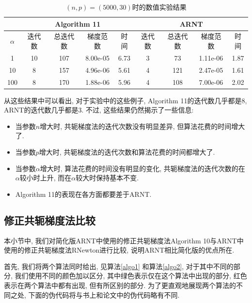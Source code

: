 \documentclass[UTF8]{ctexart}
\begin{document}
\begin{table}[htb]
    \centering
    \begin{tabular}{|c|cccc|cccc|}
        \hline
         & \multicolumn{4}{|c|}{Algorithm 11} & \multicolumn{4}{|c|}{ARNT}\\
        \hline
        $\alpha$ & 迭代数 & 总迭代数 & 梯度范数 & 时间 & 迭代数 & 总迭代数 & 梯度范数 & 时间\\
        \hline
        1 & 10 & 107 & 8.00e-05 & 6.73 & 3 & 73 & 1.11e-06 & 1.87 \\
        \hline
        10 & 8 & 157 & 4.96e-06 & 5.61 & 4 & 121 & 2.47e-05 & 1.61 \\
        \hline 
        100 & 8 & 170 & 1.88e-06 & 5.96 & 4 & 108 & 7.00e-06 & 2.02 \\
        \hline
    \end{tabular}
    \caption{$(n,p)=(5000,30)$时的数值实验结果}\label{tab5}
\end{table}

从这些结果中可以看出, 对于实验中的这些例子, Algorithm 11的迭代数几乎都是$8$, ARNT的迭代数几乎都是$3$. 不过, 这些结果仍然揭示了一些信息: 
\begin{itemize}
    \item 当参数$n$增大时, 共轭梯度法的迭代次数没有明显差异, 但算法花费的时间增大了. 
    \item 当参数$p$增大时, 共轭梯度法的迭代次数和算法花费的时间都增大了. 
    \item 当参数$\alpha$增大时, 算法花费的时间没有明显的变化, 共轭梯度法的迭代次数的在$\alpha$较小时上升, 而在$\alpha$较大时保持基本不变. 
    \item Algorithm 11的表现在各方面都要差于ARNT. 
\end{itemize}

\subsection{修正共轭梯度法比较}

本小节中, 我们对简化版ARNT中使用的修正共轭梯度法Algorithm 10与ARNT中使用的修正共轭梯度法RNewton进行比较, 说明ARNT相比简化版的优点所在. 

首先, 我们将两个算法同时给出, 见算法\ref{algo1} 和算法\ref{algo2}, 对于其中不同的部分, 我们使用不同的颜色加以区分, 其中绿色表示仅在这个算法中出现的部分, 红色表示在两个算法中都有出现, 但有所区别的部分. 为了更直观地展现两个算法的不同之处, 下面的伪代码将与书上和论文中的伪代码略有不同. 
\end{document}
